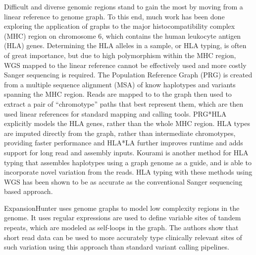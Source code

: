 Difficult and diverse genomic regions stand to gain the most by moving from a linear reference to genome graph.
To this end, much work has been done exploring the application of graphs to the major histocompatibility complex (MHC) region on chromosome 6, which contains the human leukocyte antigen (HLA) genes.
Determining the HLA alleles in a sample, or HLA typing, is often of great importance, but due to high polymorphism within the MHC region, WGS mapped to the linear reference cannot be effectively used and more costly Sanger sequencing is required.
The Population Reference Graph (PRG) \cite{dilthey2015improved} is created from a multiple sequence alignment (MSA) of know haplotypes and variants spanning the MHC region.
Reads are mapped to to the graph then used to extract a pair of ``chromotype'' paths that best represent them, which are then used linear references for standard mapping and calling tools.
PRG*HLA \cite{dilthey2018hla} explicitly models the HLA genes, rather than the whole MHC region.
HLA types are imputed directly from the graph, rather than intermediate chromotypes, providing faster performance and  HLA*LA \cite{dilthey2019hla} further improves runtime and adds support for long read and assembly inputs.
Kourami \cite{lee2018kourami} is another method for HLA typing that assembles haplotypes using a graph genome as a guide, and is able to incorporate novel variation from the reads.
HLA typing with these methods using WGS has been shown to be as accurate as the conventional Sanger sequencing based approach.

ExpansionHunter \cite{dolzhenko2019expansionhunter} uses genome graphs to model low complexity regions in the genome.
It uses regular expressions are used to define variable sites of tandem repeats, which are modeled as self-loops in the graph.
The authors show that short read data can be used to more accurately type clinically relevant sites of such variation using this approach than standard variant calling pipelines.

